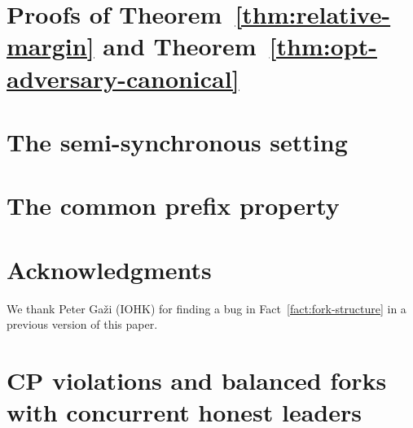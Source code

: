 \documentclass{article}
\theoremstyle{definition}
\begin{document}
\section{Proofs of Theorem~\ref{thm:relative-margin} and Theorem~\ref{thm:opt-adversary-canonical}}
\label{sec:margin-proof}


\section{The semi-synchronous setting}\label{sec:async}\label{sec:async-model}



\section{The common prefix property}\label{sec:cp}\label{sec:cp-model}



\section*{Acknowledgments}
We thank Peter Ga\v{z}i (IOHK) for finding a bug in Fact~\ref{fact:fork-structure} in a previous version of this paper. 




\appendix


% 


\break
\newpage
\section{CP violations and balanced forks with concurrent honest leaders}
\label{sec:cp-forks}






% 




% 
\end{document}

